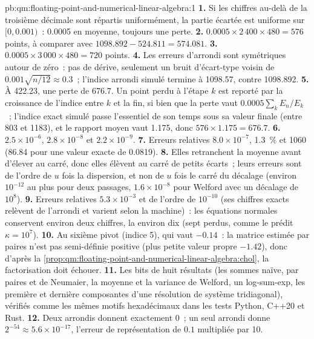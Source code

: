 \begin{solution}{pb:qm:floating-point-and-numerical-linear-algebra:1}
\textbf{1.} Si les chiffres au-delà de la troisième décimale sont répartis uniformément, la partie écartée est uniforme sur $[0, 0.001)$~: 0.0005 en moyenne, toujours une perte.
\textbf{2.} $0.0005 \times 2\,400 \times 480 = 576$ points, à comparer avec $1098.892 - 524.811 = 574.081$.
\textbf{3.} $0.0005 \times 3\,000 \times 480 = 720$ points.
\textbf{4.} Les erreurs d'arrondi sont symétriques autour de zéro~: pas de dérive, seulement un bruit d'écart-type voisin de $0.001\sqrt{n/12} \approx 0.3$~; l'indice arrondi simulé termine à 1098.57, contre 1098.892.
\textbf{5.} À 422.23, une perte de 676.7. Un point perdu à l'étape $k$ est reporté par la croissance de l'indice entre $k$ et la fin, si bien que la perte vaut $0.0005\sum_kE_n/E_k$~; l'indice exact simulé
passe l'essentiel de son temps sous sa valeur finale (entre 803 et 1183), et le rapport moyen vaut 1.175, donc $576 \times 1.175 = 676.7$.
\textbf{6.} $2.5 \times 10^{-6}$, $2.8 \times 10^{-8}$ et $2.2 \times 10^{-9}$.
\textbf{7.} Erreurs relatives $8.0 \times 10^{-7}$, 1.3~\% et 1060 (86.84 pour une valeur exacte de 0.0819).
\textbf{8.} Elles retranchent la moyenne avant d'élever au carré, donc elles élèvent au carré de petits écarts~; leurs erreurs sont de l'ordre de $u$ fois la dispersion, et non de $u$ fois le carré du décalage (environ $10^{-12}$ au plus pour deux
passages, $1.6 \times 10^{-8}$ pour Welford avec un décalage de $10^8$).
\textbf{9.} Erreurs relatives $5.3 \times 10^{-3}$ et de l'ordre de $10^{-10}$ (ses chiffres exacts relèvent de l'arrondi et varient selon la machine)~: les équations normales conservent environ deux chiffres, la  environ dix (sept perdus, comme le prédit $\kappa = 10^7$).
\textbf{10.} Au sixième pivot (indice 5), qui vaut $-0.14$~: la matrice estimée par paires n'est pas semi-définie positive (plus petite valeur propre $-1.42$), donc d'après
la \cref{prop:qm:floating-point-and-numerical-linear-algebra:chol}, la factorisation doit échouer.
\textbf{11.} Les bits de huit résultats (les sommes naïve, par paires et de Neumaier, la moyenne et la variance de Welford, un log-sum-exp, les première et dernière composantes d'une résolution de système tridiagonal), vérifiés comme
les mêmes motifs hexadécimaux dans les tests Python, C++20 et Rust.
\textbf{12.} Deux arrondis donnent exactement 0~; un seul arrondi donne $2^{-54} \approx 5.6 \times 10^{-17}$, l'erreur de représentation de $0.1$ multipliée par 10.

\end{solution}

